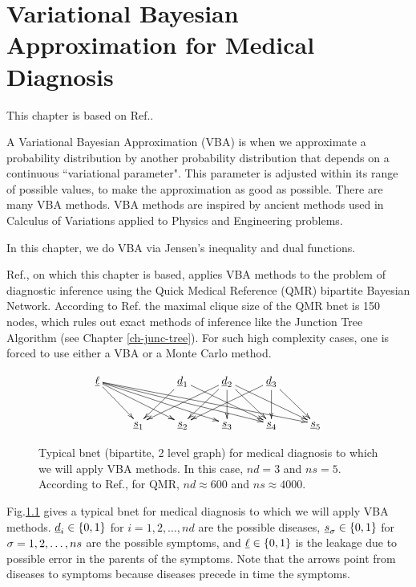 \chapter{Variational Bayesian Approximation
for Medical Diagnosis}
\label{ch-var-bay-medical}

This chapter is based
on Ref.\cite{jaak-jordan}.

A Variational Bayesian Approximation (VBA)
is when we approximate
a probability distribution
by another 
probability distribution that depends
on a continuous ``variational parameter". 
This parameter is
adjusted 
within its range of possible values,
to make the approximation
as good as possible.
There are many VBA methods.
VBA methods are inspired by 
ancient  methods
used in Calculus 
of Variations applied to Physics
and Engineering problems.

In this chapter,
we do VBA  via
Jensen's inequality and
dual functions.

Ref.\cite{jaak-jordan}, on which
this chapter is based,
applies VBA methods to the problem of diagnostic inference using the Quick Medical Reference (QMR) bipartite Bayesian Network. 
According to Ref.\cite{jaak-jordan} 
the maximal clique size of the QMR 
bnet is
150 nodes, which rules out exact methods
of inference like the Junction Tree Algorithm
(see Chapter \ref{ch-junc-tree}).
For such high complexity cases,
one is forced to use
either a VBA or a Monte Carlo method.

\begin{figure}[h!]
$$\xymatrix{
\ul{\ell}
\ar[dr]\ar[drr]\ar[drrr]\ar[drrrr]\ar[drrrrr]
&
&\rvd_1\ar[dl]\ar[drr]
&\rvd_2\ar[dll]\ar[dl]\ar[dr]\ar[d]\ar[drr]
&\rvd_3\ar[dll]\ar[d]\ar[dr]
\\
&\rvs_1
&\rvs_2
&\rvs_3
&\rvs_4
&\rvs_5
}$$
\caption{
Typical bnet (bipartite, 2 level graph) 
for medical diagnosis
to which we will apply VBA
methods.
In this case, $nd=3$ and
$ns=5$. 
According to Ref.\cite{jaak-jordan},
for QMR, $nd\approx 600$ 
and $ns\approx 4000$.
}
\label{fig-var-bay-med-bnet}
\end{figure}

Fig.\ref{fig-var-bay-med-bnet}
gives a typical bnet
for medical diagnosis
to which we will apply VBA methods.
${\underline{d}}_i\in \{0,1\}$
for $i=1,2, \ldots, nd$
are the possible diseases,
${\underline{s}}_\sigma\in\{0,1\}$ 
for $\sigma=1,2, \ldots, ns$ are the possible
symptoms, and $\underline{\ell}\in\{0,1\}$
is the leakage  due to 
possible error in 
the parents of the symptoms.
Note that the 
arrows point from
diseases to symptoms
because diseases precede
in time
the symptoms.


